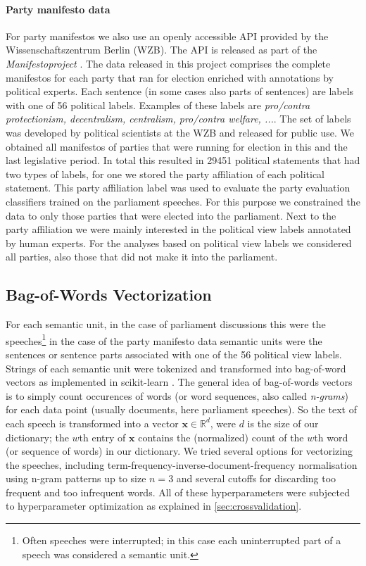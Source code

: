 \documentclass[runningheads,a4paper]{llncs}
\renewcommand{\vec}[1]{\mathbf{#1}}
\begin{document}
\paragraph{Party manifesto data}
For party manifestos we also use an openly accessible API provided by the Wissenschaftszentrum Berlin (WZB). The API is released as part of the {\em Manifestoproject} \cite{manifesto}. The data released in this project comprises the complete manifestos for each party that ran for election enriched with annotations by political experts. Each sentence (in some cases also parts of sentences) are labels with one of 56 political labels. Examples of these labels are {\em pro/contra protectionism, decentralism, centralism, pro/contra welfare, ...}. The set of labels was developed by political scientists at the WZB and released for public use. We obtained all manifestos of parties that were running for election in this and the last legislative period. In total this resulted in 29451 political statements that had two types of labels, for one we stored the party affiliation of each political statement. This party affiliation label was used to evaluate the party evaluation classifiers trained on the parliament speeches. For this purpose we constrained the data to only those parties that were elected into the parliament. Next to the party affiliation we were mainly interested in the political view labels annotated by human experts. For the analyses based on political view labels we considered all parties, also those that did not make it into the parliament. 

\subsection{Bag-of-Words Vectorization}\label{sec:bow-vectorization}
For each semantic unit, in the case of parliament discussions this were the speeches\footnote{Often speeches were interrupted; in this case each uninterrupted part of a speech was considered a semantic unit.} in the case of the party manifesto data semantic units were the sentences or sentence parts associated with one of the 56 political view labels. Strings of each semantic unit were tokenized and transformed into bag-of-word vectors as implemented in scikit-learn \cite{scikit-learn}. The general idea of bag-of-words vectors is to simply count occurences of words (or word sequences, also called {\em n-grams}) for each data point (usually documents, here parliament speeches). So the text of each speech is transformed into a vector $\vec{x}\in\mathds{R}^d$, were $d$ is the size of our dictionary; the $w$th entry of $\vec{x}$ contains the (normalized) count of the $w$th word (or sequence of words) in our dictionary. We tried several options for vectorizing the speeches, including term-frequency-inverse-document-frequency normalisation using n-gram patterns up to size $n=3$ and several cutoffs for discarding too frequent and too infrequent words. All of these hyperparameters were subjected to hyperparameter optimization as explained in \autoref{sec:crossvalidation}. 
\end{document}
